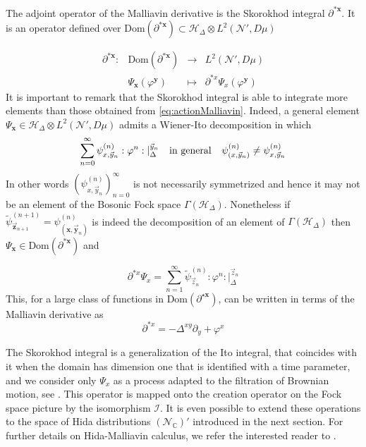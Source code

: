 \documentclass[12pt]{article}%
\begin{document}
The adjoint operator of the Malliavin derivative is the Skorokhod integral $\partial^{*\mathbf{x}}$. It is an operator defined over $\textrm{Dom}(\partial^{*\mathbf{x}})\subset\mathcal{H}_\Delta\otimes L^2(\mathcal{N}',D\mu)$ 

\begin{equation}
    \label{eq:SkorokhodIntegral}
    \begin{array}{cccc}
        \partial^{*\mathbf{x}}:& \textrm{Dom}(\partial^{*\mathbf{x}}) &\longrightarrow &L^2(\mathcal{N}',D\mu)\\
         & \Psi_{\mathbf{x}}(\varphi^{\mathbf{y}}) & \longmapsto & \partial^{*{x}} \Psi_{x}(\varphi^{\mathbf{y}})
    \end{array}
\end{equation}
It is important to remark that the Skorokhod integral is able to integrate more elements than those obtained from \eqref{eq:actionMalliavin}. Indeed, a general element $\Psi_{\mathbf{x}}\in\mathcal{H}_\Delta\otimes L^2(\mathcal{N}',D\mu)$ admits a Wiener-Ito decomposition in which 
\begin{equation}
\label{eq:parametricWienerIto}
\sum_{n=0}^\infty\psi^{(n)}_{x,\vec{y}_n}:\varphi^n:\lvert_\Delta^{\vec{y}_n}\hspace{0.25 cm} \textrm{ in general } \hspace{0.25 cm}  \psi^{(n)}_{(x,\vec{y}_n)}\neq \psi^{(n)}_{x,\vec{y}_n}
\end{equation}
In other words $(\psi^{(n)}_{x,\vec{y}_n})_{n=0}^\infty$ is not necessarily symmetrized and hence it may not be an  element of the Bosonic Fock space $\Gamma(\mathcal{H}_\Delta)$. Nonetheless if  
$\tilde{\psi}^{(n+1)}_{\vec{\mathbf{z}}_{n+1}}=\psi^{(n)}_{(\mathbf{x},\vec{\mathbf{y}}_n)}$ is indeed the decomposition of an element of $\Gamma(\mathcal{H}_\Delta)$ then $\Psi_{\mathbf{x}}\in  \textrm{Dom}(\partial^{*\mathbf{x}})$ and 

\begin{equation}
\label{eq:actionSkorokhod}
\partial^{*{x}}\Psi_{{x}}=\sum_{n=1}^{\infty} \tilde{\psi}^{(n)}_{\vec{z}_n}:\varphi^n:\lvert_\Delta^{\vec{z}_n}
\end{equation}
This, for a large class of functions in $\textrm{Dom}(\partial^{\star\mathbf{x}})$, can be written in terms of the Malliavin derivative as 
\begin{equation}
\label{eq:creationOperator}
\partial^{*{x}}=-\Delta^{xy}\partial_y+\varphi^x
\end{equation}

The Skorokhod integral is a generalization of the Ito integral, that coincides with it when the domain has dimension one that is identified with a time parameter, and we consider only $\Psi_x$ as a process adapted to the filtration of Brownian motion, see \cite{Nunno2009}.  This operator is mapped onto the creation operator on the Fock space picture by the isomorphism $\mathcal{I}$. 
It is even possible to extend these operations to the space of Hida distributions  $(\mathcal{N}_\mathbb{C})'$ introduced in the next section. For further details on Hida-Malliavin calculus,  we refer the interested reader to  \cite{Nunno2009}.
\end{document}
